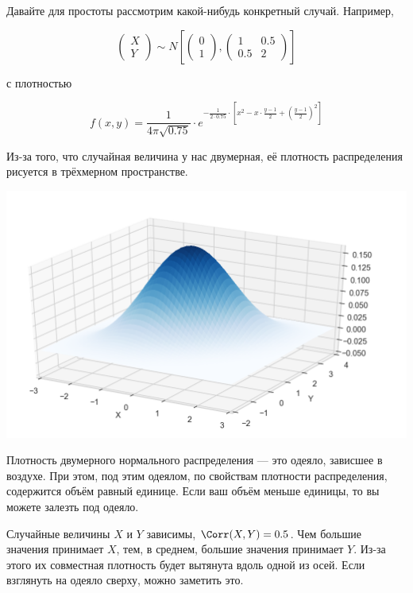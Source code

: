 \documentclass[12pt, a4paper, oneside]{article}
\begin{document}
Давайте для простоты рассмотрим какой-нибудь конкретный случай. Например, 

\[ 
\begin{pmatrix}
X \\
Y
\end{pmatrix} \sim N \left[
\begin{pmatrix}
0 \\
1
\end{pmatrix} ,
\begin{pmatrix}
1 & 0.5 \\
0.5  & 2
\end{pmatrix} 
\right]
\]

с плотностью 

\[
f(x,y) = \frac{1}{4 \pi \sqrt{0.75}} \cdot e^{-\frac{1}{2 \cdot 0.75} \cdot \left[ x^2 - x \cdot \frac{y - 1}{2} + \left( \frac{y - 1}{2}    \right)^2   \right]}
\]

Из-за того, что случайная величина у нас двумерная, её плотность распределения рисуется в трёхмерном пространстве. 

\begin{center}
\includegraphics[scale=0.25]{two_normal_1.png}
\end{center}

Плотность двумерного нормального распределения --- это одеяло, зависшее в воздухе. При этом, под этим одеялом, по свойствам плотности распределения,  содержится объём равный единице. Если ваш объём меньше единицы, то вы можете залезть под одеяло. 

Случайные величины $X$ и $Y$ зависимы, $\Corr(X,Y) = 0.5$. Чем большие значения принимает $X$, тем, в среднем, большие значения принимает $Y$. Из-за этого их совместная плотность будет вытянута вдоль одной из осей. Если взглянуть на одеяло сверху, можно заметить это. 
\end{document}
